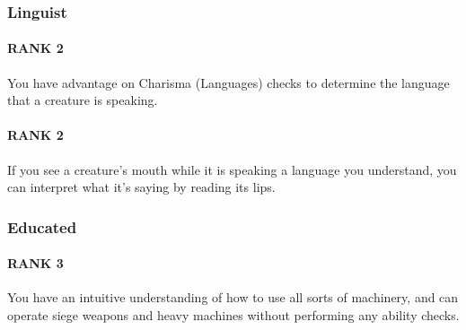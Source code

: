 \subsubsection{Linguist} \label{feat::linguist}
\paragraph{RANK 2} You have advantage on Charisma (Languages) checks to determine the language that a creature is speaking.
\paragraph{RANK 2} If you see a creature's mouth while it is speaking a language you understand, you can interpret what it's saying by reading its lips.

\subsubsection{Educated} \label{feat::educated}
\paragraph{RANK 3} You have an intuitive understanding of how to use all sorts of machinery, and can operate siege weapons and heavy machines without performing any ability checks.
